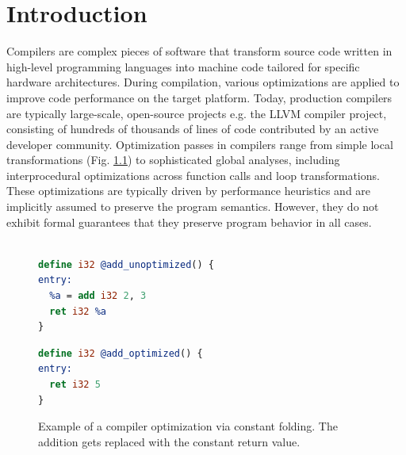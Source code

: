 \hypersetup{linkcolor=purple}
\chapter{Introduction}

Compilers are complex pieces of software that transform source code written in high-level programming languages into machine code tailored for specific hardware architectures. During compilation, various optimizations are applied to improve code performance on the target platform. Today, production compilers are typically large-scale, open-source projects e.g. the LLVM compiler project, consisting of hundreds of thousands of lines of code contributed by an active developer community. Optimization passes in compilers range from simple local transformations (Fig. \ref{fig:intro_constant_folding}) to sophisticated global analyses, including interprocedural optimizations across function calls and loop transformations. These optimizations are typically driven by performance heuristics and are implicitly assumed to preserve the program semantics. However, they do not exhibit formal guarantees that they preserve program behavior in all cases. 

\begin{figure}[ht]
\centering
\begin{minipage}{0.45\textwidth}
\begin{lstlisting}[language=LLVM]

define i32 @add_unoptimized() {
entry:
  %a = add i32 2, 3
  ret i32 %a
}
\end{lstlisting}
\end{minipage}
\hspace{0.05\textwidth}
\begin{minipage}{0.45\textwidth}
\begin{lstlisting}[language=LLVM]
define i32 @add_optimized() {
entry:
  ret i32 5
}
\end{lstlisting}
\end{minipage}
\caption{Example of a compiler optimization via constant folding. The addition gets replaced with the constant return value.}
\label{fig:intro_constant_folding}
\end{figure}


